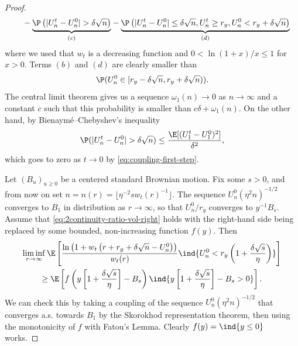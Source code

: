 \documentclass[10pt,a4paper]{article}
\begin{document}
\begin{proof}
\begin{align}
&\qquad - \underset{(c)}{\underbrace{\P\left( |U_n^t - U_n^0| > \delta\sqrt{n} \right)}} - \underset{(d)}{\underbrace{\P\left( |U_n^t-U_n^0|\leq \delta\sqrt{n}, U_n^t\geq r_y, U_n^0<r_y+\delta\sqrt{n} \right)}} \label{eq:discounted-expectation-X}
\end{align}
where we used that $w_t$ is a decreasing function and $0< \ln(1+x)/x \leq 1$ for $x>0$. Terms $(b)$ and $(d)$ are clearly smaller than
\[ \P(U_n^0 \in [r_y - \delta\sqrt{n}, r_y+\delta\sqrt{n}) ) . \]
The central limit theorem gives us a sequence $\omega_1(n) \to 0$ as $n\to\infty$ and a constant $c$ such that this probability is smaller than $c\delta + \omega_1(n)$. On the other hand, by Bienaymé--Chebyshev's inequality
\[ \P(|U_n^t-U_n^0|>\delta\sqrt{n}) \leq \frac{\E[(U_1^t - U_1^0)^2]}{\delta^2} , \]
which goes to zero as $t\to 0$ by \eqref{eq:coupling-first-step}. 

Let $(B_u)_{u\geq 0}$ be a centered standard Brownian motion. Fix some $s>0$, and from now on set $n = n(r) = \lfloor \eta^{-2} s w_t(r)^{-1}\rfloor$. The sequence $U_n^0 (\eta^2 n)^{-1/2}$ converges to $B_1$ in distribution as $r\to\infty$, so that $U_n^0/r_y$ converges to $y^{-1} B_s$. 
Assume that \eqref{eq:2continuity-ratio-vol-right} holds with the right-hand side being replaced by some bounded, non-increasing function $f(y)$. Then 
\begin{multline*}
\liminf_{r\to\infty} \E\left[ \frac{\ln\left(1+w_t\left(r+r_y+\delta\sqrt{n} - U_n^0\right)\right)}{w_t(r)} \ind{U_n^0 < r_y\left(1 + \frac{\delta \sqrt{s}}{\eta}\right)} \right] \\
\geq \E\left[ f\left( y\left[ 1 + \frac{\delta\sqrt{s}}{\eta} \right] - B_s \right) \ind{y\left[ 1 + \frac{\delta\sqrt{s}}{\eta} \right] - B_s > 0} \right] .
\end{multline*}
We can check this by taking a coupling of the sequence $U_n^0 (\eta^2 n)^{-1/2}$ that converges a.s. towards $B_1$ by the Skorokhod representation theorem, then using the monotonicity of $f$ with Fatou's Lemma. Clearly $f(y) = \ind{y\leq 0}$ works. %


\end{proof}
\end{document}
